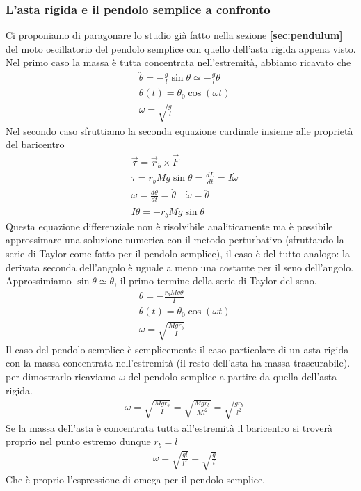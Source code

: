 \documentclass[10pt,a4paper]{article}
\begin{document}
\subsubsection{L'asta rigida e il pendolo semplice a confronto}
Ci proponiamo di paragonare lo studio già fatto nella sezione \textbf{\ref{sec:pendulum}} del moto oscillatorio del pendolo semplice con quello dell'asta rigida appena visto.\\
Nel primo caso la massa è tutta concentrata nell'estremità, abbiamo ricavato che 
\begin{align*}
	&\ddot{\theta} = -\frac{g}{l}\sin\theta \simeq -\frac{g}{l} \theta \\
	&\theta(t) = \theta_0 \cos(\omega t)\\
	&\omega = \sqrt{\frac{g}{l}}
\end{align*}
Nel secondo caso sfruttiamo la seconda equazione cardinale insieme alle proprietà del baricentro
\begin{align*}
	&\vec{\tau} = \vec{r}_b \times \vec{F}\\
	&\tau = r_b Mg \sin \theta = \frac{dL}{dt} = I \dot{\omega}\\
	&\omega = \frac{d \theta}{dt} = \dot{\theta} \quad \dot{\omega} = \ddot{\theta}\\
	& I\ddot{\theta} = -r_b Mg \sin\theta
\end{align*}
Questa equazione differenziale non è risolvibile analiticamente ma è possibile approssimare una soluzione numerica con il metodo perturbativo (sfruttando la serie di Taylor come fatto per il pendolo semplice), il caso è del tutto analogo: la derivata seconda dell'angolo è uguale a meno una costante per il seno dell'angolo. Approssimiamo $\sin\theta \simeq \theta$, il primo termine della serie di Taylor del seno. 
\begin{align*}
	&\ddot{\theta} = -\frac{r_b M g \theta}{I}\\
	&\theta(t) = \theta_0 \cos(\omega t)\\
	&\omega = \sqrt{\frac{M g r_b}{I}} 
\end{align*}
Il caso del pendolo semplice è semplicemente il caso particolare di un asta rigida con la massa concentrata nell'estremità (il resto dell'asta ha massa trascurabile). per dimostrarlo ricaviamo $\omega$ del pendolo semplice a partire da quella dell'asta rigida.
\begin{align*}
	&\omega = \sqrt{\frac{M g r_b}{I}} = \sqrt{\frac{M g r_b}{M l^2}} = \sqrt{\frac{g r_b}{l^2}}
\end{align*}
Se la massa dell'asta è concentrata tutta all'estremità il baricentro si troverà proprio nel punto estremo dunque $r_b = l$
\begin{align*}
	&\omega = \sqrt{\frac{g l}{l^2}} = \sqrt{\frac{g}{l}} 
\end{align*}
Che è proprio l'espressione di omega per il pendolo semplice.
\end{document}
